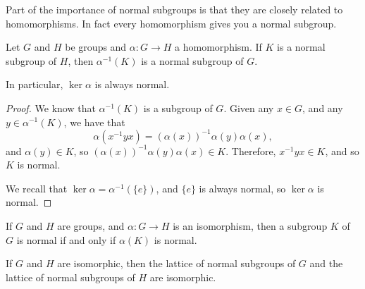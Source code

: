 Part of the importance of normal subgroups is that they are closely related
to homomorphisms.  In fact every homomorphism gives you a normal subgroup.

\begin{theorem}\label{thm:inversenormal}
  Let $G$ and $H$ be groups and $\alpha: G \to H$ a homomorphism.  If $K$ is
  a normal subgroup of $H$, then $\alpha^{-1}(K)$ is a normal subgroup of
  $G$.
  
  In particular, $\ker \alpha$ is always normal.
\end{theorem}
\begin{proof}
  We know that $\alpha^{-1}(K)$ is a subgroup of $G$.  Given any $x \in G$,
  and any $y \in \alpha^{-1}(K)$, we have that
  \[
    \alpha(x^{-1}yx) = (\alpha(x))^{-1}\alpha(y)\alpha(x),
  \]
  and $\alpha(y) \in K$, so $(\alpha(x))^{-1}\alpha(y)\alpha(x) \in K$. 
  Therefore, $x^{-1}yx \in K$, and so $K$ is normal.
  
  We recall that $\ker \alpha = \alpha^{-1}(\{e\})$, and $\{e\}$ is always
  normal, so $\ker \alpha$ is normal.
\end{proof}

\begin{corollary}
  If $G$ and $H$ are groups, and $\alpha : G \to H$ is an isomorphism, then
  a subgroup $K$ of $G$ is normal if and only if $\alpha(K)$ is normal.
\end{corollary}

\begin{corollary}
  If $G$ and $H$ are isomorphic, then the lattice of normal subgroups of $G$
  and the lattice of normal subgroups of $H$ are isomorphic.
\end{corollary}

